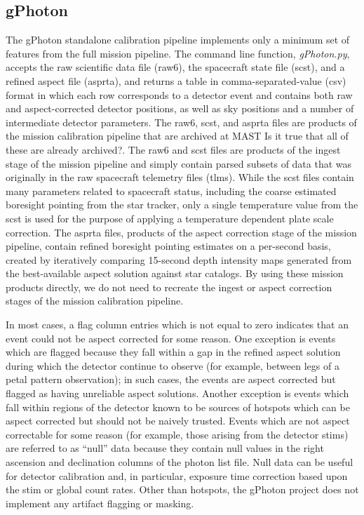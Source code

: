 \documentclass[preprint]{aastex}
\begin{document}
\subsection{gPhoton}
The gPhoton standalone calibration pipeline implements only a minimum set of features from the full mission pipeline. The command line function, \textit{gPhoton.py}, accepts the raw scientific data file (raw6), the spacecraft state file (scst), and a refined aspect file (asprta), and returns a table in comma-separated-value (csv) format in which each row corresponds to a detector event and contains both raw and aspect-corrected detector positions, as well as sky positions and a number of intermediate detector parameters. The raw6, scst, and asprta files are products of the mission calibration pipeline that are archived at MAST {\color{red}Is it true that all of these are already archived?}. The raw6 and scst files are products of the ingest stage of the mission pipeline and simply contain parsed subsets of data that was originally in the raw spacecraft telemetry files (tlms). While the scst files contain many parameters related to spacecraft status, including the coarse estimated boresight pointing from the star tracker, only a single temperature value from the scst is used for the purpose of applying a temperature dependent plate scale correction. The asprta files, products of the aspect correction stage of the mission pipeline, contain refined boresight pointing estimates on a per-second basis, created by iteratively comparing 15-second depth intensity maps generated from the best-available aspect solution against star catalogs. By using these mission products directly, we do not need to recreate the ingest or aspect correction stages of the mission calibration pipeline.

In most cases, a flag column entries which is not equal to zero indicates that an event could not be aspect corrected for some reason. One exception is events which are flagged because they fall within a gap in the refined aspect solution during which the detector continue to observe (for example, between legs of a petal pattern observation); in such cases, the events are aspect corrected but flagged as having unreliable aspect solutions. Another exception is events which fall within regions of the detector known to be sources of hotspots which can be aspect corrected but should not be naively trusted. Events which are not aspect correctable for some reason (for example, those arising from the detector stims) are referred to as “null” data because they contain null values in the right ascension and declination columns of the photon list file. Null data can be useful for detector calibration and, in particular, exposure time correction based upon the stim or global count rates. Other than hotspots, the gPhoton project does not implement any artifact flagging or masking.
\end{document}
